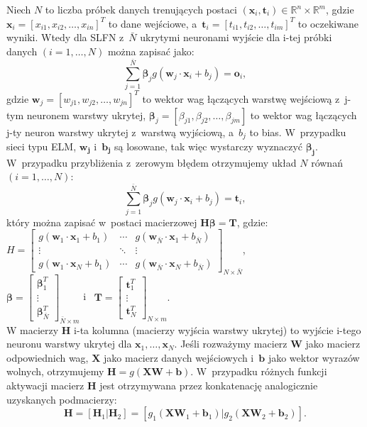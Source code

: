 \documentclass{article}
\begin{document}
Niech $N$ to liczba próbek danych trenujących postaci $(\bm{x}_i, \bm{t}_i) \in \mathbb{R}^n \times \mathbb{R}^m$, gdzie $\bm{x}_i = [x_{i1}, x_{i2}, \dots,  x_{in}]^T$ to dane wejściowe, a~$\bm{t}_i = [t_{i1}, t_{i2}, \dots,  t_{im}]^T$ to oczekiwane wyniki. Wtedy dla SLFN z~$\bar{N}$ ukrytymi neuronami wyjście dla i-tej próbki danych $(i=1,\dots,N)$ można zapisać jako:
\begin{equation}
\sum_{j=1}^{\bar{N}} \bm{\beta}_j g (\bm{w}_j \cdot \bm{x}_i + b_j)  = \bm{o}_i,
\end{equation}
gdzie $\bm{w}_j = [w_{j1}, w_{j2},\dots,w_{jn}]^T$ to wektor wag łączących warstwę wejściową z~j-tym neuronem warstwy ukrytej, $\bm{\beta}_j = [\beta_{j1}, \beta_{j2}, \dots, \beta_{jm}]$ to wektor wag łączących j-ty neuron warstwy ukrytej z~warstwą wyjściową, a~$b_j$ to bias. W~przypadku sieci typu ELM, $\bm{w_j}$ i~$\bm{b_j}$ są losowane, tak więc wystarczy wyznaczyć $\bm{\beta_j}$.  W~przypadku przybliżenia z~zerowym błędem otrzymujemy układ $N$ równań $(i=1,\dots,N)$:
\begin{equation}
\sum_{j=1}^{\bar{N}} \bm{\beta}_j g (\bm{w}_j \cdot \bm{x}_i + b_j)  = \bm{t}_i,
\end{equation}
który można zapisać w~postaci macierzowej $\bm{H}\bm{\beta}=\bm{T}$, gdzie: \\
$
H = \begin{bmatrix}
 g(\bm{w}_1 \cdot \bm{x}_1 + b_1) & \cdots & g(\bm{w}_{\bar{N}} \cdot \bm{x}_1 + b_{\bar{N}}) \\
 \vdots & \ddots & \vdots \\
 g(\bm{w}_1 \cdot \bm{x}_N + b_1) & \cdots & g(\bm{w}_{\bar{N}} \cdot \bm{x}_N + b_{\bar{N}})
\end{bmatrix}_{N \times \bar{N}}$, \\
$\bm{\beta} = \begin{bmatrix} \bm{\beta}_1^T \\ \vdots \\ \bm{\beta}_{\bar{N}}^T \end{bmatrix}_{\bar{N} \times m}$ i~
 $ \bm{T} = \begin{bmatrix} \bm{t}_1^T \\ \vdots \\ \bm{t}_N^T \end{bmatrix}_{N \times m}. $\\
W macierzy $\bm{H}$ i-ta kolumna (macierzy wyjścia warstwy ukrytej) to wyjście i-tego neuronu warstwy ukrytej dla $\bm{x}_1, \dots, \bm{x}_N$. Jeśli rozważymy macierz $\bm{W}$ jako macierz odpowiednich wag, $\bm{X}$ jako macierz danych wejściowych i~$\bm{b}$ jako wektor wyrazów wolnych, otrzymujemy $\bm{H} = g(\bm{XW} + \bm{b})$. W~przypadku różnych funkcji aktywacji macierz $\bm{H}$ jest otrzymywana przez konkatenację analogicznie uzyskanych podmacierzy: 
\begin{equation}
\bm{H} = [\bm{H}_1 | \bm{H}_2] = [g_1(\bm{XW}_1 + \bm{b}_1) | g_2(\bm{XW}_2 + \bm{b}_2)]. 
\end{equation}
\end{document}
